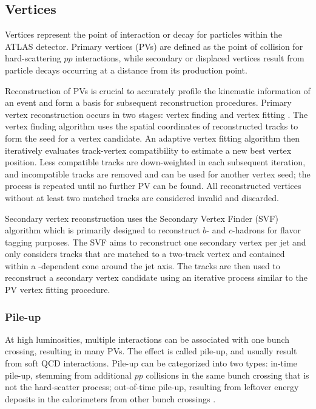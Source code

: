 \documentclass[../thesis.tex]{subfiles}
\begin{document}
\subsection{Vertices}
\label{sec:vertex}
Vertices represent the point of interaction or decay for particles within the ATLAS detector. Primary vertices (\acs{PV}s) are defined as the point of collision for hard-scattering $pp$ interactions, while secondary or displaced vertices result from particle decays occurring at a distance from its production point. 

Reconstruction of \acs{PV}s is crucial to accurately profile the kinematic information of an event and form a basis for subsequent reconstruction procedures. Primary vertex reconstruction occurs in two stages: vertex finding and vertex fitting \citep{reco:vertex_primary}. The vertex finding algorithm uses the spatial coordinates of reconstructed tracks to form the seed for a vertex candidate. An adaptive vertex fitting algorithm \citep{reco:vertex_fitting} then iteratively evaluates track-vertex compatibility to estimate a new best vertex position. Less compatible tracks are down-weighted in each subsequent iteration, and incompatible tracks are removed and can be used for another vertex seed; the process is repeated until no further \acs{PV} can be found. All reconstructed vertices without at least two matched tracks are considered invalid and discarded.

Secondary vertex reconstruction uses the Secondary Vertex Finder (SVF) algorithm \citep{reco:vertex_secondary} which is primarily designed to reconstruct $b$- and $c$-hadrons for flavor tagging purposes. The SVF aims to reconstruct one secondary vertex per jet and only considers tracks that are matched to a two-track vertex and contained within a \pT-dependent cone around the jet axis. The tracks are then used to reconstruct a secondary vertex candidate using an iterative process similar to the \acs{PV} vertex fitting procedure.

\subsubsection*{Pile-up}
At high luminosities, multiple interactions can be associated with one bunch crossing, resulting in many \acs{PV}s. The effect is called pile-up, and usually result from soft \acs{QCD} interactions. Pile-up can be categorized into two types: in-time pile-up, stemming from additional $pp$ collisions in the same bunch crossing that is not the hard-scatter process; out-of-time pile-up, resulting from leftover energy deposits in the calorimeters from other bunch crossings \citep{reco:pileup}.
\end{document}
